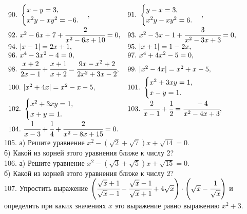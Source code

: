 $\begin{array}{ll}
90.\ \begin{cases}
x-y=3,\\
x^2y-xy^2=-6.
\end{cases},&
91.\ \begin{cases}
y-x=3,\\
x^2y-xy^2=6.
\end{cases},\\
92.\ x^2-6x+7+\cfrac{2}{x^2-6x+10}=0,&
93.\ x^2-3x-1+\cfrac{3}{x^2-3x+3}=0,\\
94.\ |x-1|=2x+1,&
95.\ |x+1|=1-2x,\\
96.\ x^4-3x^2-4=0,&
97.\ x^4+4x^2-5=0, \\
98.\ \cfrac{x+2}{2x-1}+\cfrac{x+1}{x+2}=\cfrac{9x-x^2+2}{2x^2+3x-2},&
99.\ |x^2-4x|=x^2+x-5,\\
100.\ |x^2+4x|=x^2-x-5,&
101.\ \begin{cases} x^2+3xy=1,\\ x-y=1.\end{cases}\\
102.\ \begin{cases} x^2+3xy=1,\\ x+y=1.\end{cases}&
103.\ \cfrac{2}{x-1}+\cfrac{1}{2}=\cfrac{-4}{x^2-4x+3},\\
104.\ \cfrac{1}{x-3}+\cfrac{1}{4}+\cfrac{2}{x^2-8x+15}=0.
\end{array}$\\
105. а) Решите уравнение $x^2-(\sqrt{2}+\sqrt{7})x+\sqrt{14}=0.$\\
б) Какой из корней этого уравнения ближе к числу 2?\\
106. а) Решите уравнение $x^2-(\sqrt{3}+\sqrt{5})x+\sqrt{15}=0.$\\
б) Какой из корней этого уравнения ближе к числу 2?\\
107. Упростить выражение $\left(\cfrac{\sqrt{x}+1}{\sqrt{x}-1}-\cfrac{\sqrt{x}-1}{\sqrt{x}+1}+4\sqrt{x}\right)\cdot\left(\sqrt{x}-\cfrac{1}{\sqrt{x}}\right)$ и определить при каких значениях $x$ это выражение равно выражению $x^2+3.$\\
